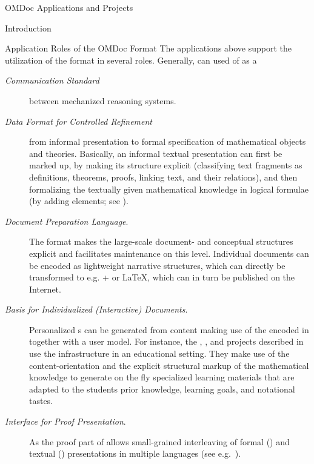 \begin{tchapter}[id=projects,short=Applications and Projects]{OMDoc Applications and Projects}
\begin{tsection}[id=projeccts-intro]{Introduction}
\begin{tsubsection}[id=omdoc-roles]{Application Roles of the OMDoc Format}
  The applications above support the utilization of the {\omdoc} format in several
  roles. Generally, {\omdoc} can used of as a
\begin{description}
\item[\emph{Communication Standard}] between mechanized
reasoning systems.
\item[\emph{Data Format for Controlled Refinement}] from
  informal presentation to formal specification of mathematical objects and theories.
  Basically, an informal textual presentation can first be marked up, by making its
  structure explicit (classifying text fragments as
  definitions, theorems, proofs, linking text, and their relations), and then formalizing
  the textually given mathematical knowledge in logical formulae (by adding
  {} elements; see {}).
\item[\emph{Document Preparation Language}.]  The
  {\omdoc} format makes the large-scale document- and conceptual structures explicit and
  facilitates maintenance on this level. Individual documents can be encoded as
  lightweight narrative structures, which can directly be transformed to e.g.
  {\xhtml}+{\mathml} or {\LaTeX}, which can in turn be published on the Internet.
\item[\emph{Basis for Individualized (Interactive)
    Documents}.] Personalized
  {s} can be generated from {\mbase} content making use of
  the {} encoded in {\mbase} together with a user model.
  For instance, the {\mmiss}, {\MathDox}, and {\activemath} projects described in
  {} use the {\omdoc} infrastructure in an educational
  setting. They make use of the content-orientation and the explicit structural markup of
  the mathematical knowledge to generate on the fly specialized learning materials that
  are adapted to the students prior knowledge, learning goals, and notational tastes.
\item[\emph{Interface for Proof Presentation}.] As the proof
  part of {\omdoc} allows small-grained interleaving of formal ({}) and
  textual ({}) presentations in multiple languages (see
  e.g.~\cite{HuangFiedler:pvip97,Fiedler:uacatp99}).
\end{description}
\end{tsubsection}


\end{tsection}
\end{tchapter}
